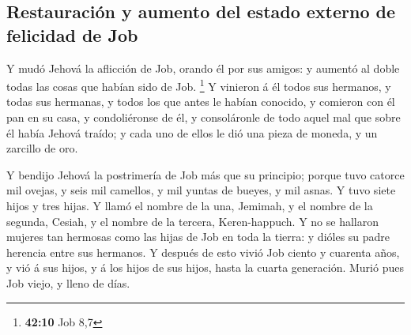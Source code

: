 \hypertarget{restauraciuxf3n-y-aumento-del-estado-externo-de-felicidad-de-job}{%
\subsection{Restauración y aumento del estado externo de felicidad de
Job}\label{restauraciuxf3n-y-aumento-del-estado-externo-de-felicidad-de-job}}

 Y mudó Jehová la aflicción de Job, orando él por sus
amigos: y aumentó al doble todas las cosas que habían sido de Job.
\footnote{\textbf{42:10} Job 8,7}  Y vinieron á él todos
sus hermanos, y todas sus hermanas, y todos los que antes le habían
conocido, y comieron con él pan en su casa, y condoliéronse de él, y
consoláronle de todo aquel mal que sobre él había Jehová traído; y cada
uno de ellos le dió una pieza de moneda, y un zarcillo de oro.

 Y bendijo Jehová la postrimería de Job más que su
principio; porque tuvo catorce mil ovejas, y seis mil camellos, y mil
yuntas de bueyes, y mil asnas.  Y tuvo siete hijos y tres
hijas.  Y llamó el nombre de la una, Jemimah, y el nombre
de la segunda, Cesiah, y el nombre de la tercera, Keren-happuch.
 Y no se hallaron mujeres tan hermosas como las hijas de
Job en toda la tierra: y dióles su padre herencia entre sus hermanos.
 Y después de esto vivió Job ciento y cuarenta años, y
vió á sus hijos, y á los hijos de sus hijos, hasta la cuarta generación.
 Murió pues Job viejo, y lleno de días.
